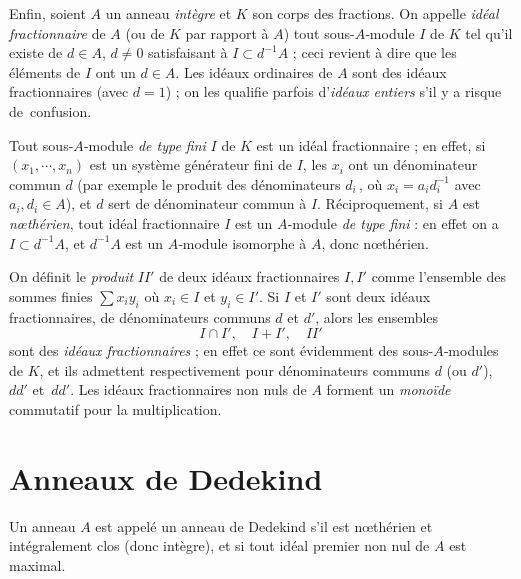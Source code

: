 \documentclass[11pt, %
  title in boldface,
  theorem in new line,
  theorem numbering = section,
  number theorems separately,
  simple name,
]{beaulivre}
\begin{document}
    Enfin, soient \( A \) un anneau \emph{intègre} et \( K \) son corps des fractions. On appelle \emph{idéal fractionnaire} de \( A \) (ou de \( K \) par rapport à \( A \)) tout sous-\( A \)‑module \( I \) de \( K \) tel qu'il existe de \( d \in A \), \( d \neq 0 \) satisfaisant à \( I \subset d^{-1}A \) ; ceci revient à dire que les éléments de \( I \) ont un  \( d \in A \). Les idéaux ordinaires de \( A \) sont des idéaux fractionnaires (avec \( d = 1 \)) ; on les qualifie parfois d'\emph{idéaux entiers} s'il y a risque de~confusion.

    Tout sous-\( A \)‑module \emph{de type fini} \( I \) de \( K \) est un idéal fractionnaire ; en effet, si \( (x_1, \cdots, x_n) \) est un système générateur fini de \( I \), les \( x_i \) ont un dénominateur commun \( d \) (par exemple le produit des dénominateurs \( d_i \)\,, où \( x_i = a_i d_i^{-1} \) avec \( a_i, d_i \in A \)), et \( d \) sert de dénominateur commun à \( I \). Réciproquement, si \( A \) est \emph{nœthérien}, tout idéal fractionnaire \( I \) est un \( A \)‑module \emph{de type fini} : en effet on a \( I \subset d^{-1} A \), et \( d^{-1} A \) est un \( A \)‑module isomorphe à \( A \), donc nœthérien.

    On définit le \emph{produit} \( I I' \) de deux idéaux fractionnaires \( I, I' \) comme l'ensemble des sommes finies \( \sum x_i y_i \) où \( x_i \in I \) et \( y_i \in I' \). Si \( I \) et \( I' \) sont deux idéaux fractionnaires, de dénominateurs communs \( d \) et \( d' \), alors les ensembles
    \[
        I \cap I', \quad I+I', \quad I I'
    \]
    sont des \emph{idéaux fractionnaires} ; en effet ce sont évidemment des sous-\( A \)‑modules de \( K \), et ils admettent respectivement pour dénominateurs communs \( d \) (ou \( d' \)), \( d d' \) et~\( d d' \). Les idéaux fractionnaires non nuls de \( A \) forment un \emph{monoïde} commutatif pour la multiplication.

\section{Anneaux de Dedekind}\label{sec:anneaux de Dedekind}

    \begin{definition}
        Un anneau \( A \) est appelé un anneau de Dedekind s'il est nœthérien et intégralement clos (donc intègre), et si tout idéal premier non nul de \( A \) est maximal.
    \end{definition}
\end{document}
